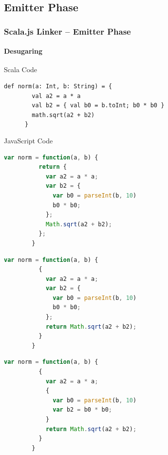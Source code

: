 \documentclass{beamer}
\begin{document}


\subsection{Emitter Phase}

\begin{frame}[fragile]
  \frametitle{Scala.js Linker -- Emitter Phase}
  \framesubtitle{Desugaring}

  \begin{block}{Scala Code\phantom{p}}
    \begin{lstlisting}[gobble=6]
      def norm(a: Int, b: String) = {
        val a2 = a * a
        val b2 = { val b0 = b.toInt; b0 * b0 }
        math.sqrt(a2 + b2)
      }
    \end{lstlisting}
  \end{block}

  \pause

  \begin{block}{JavaScript Code}
    \begin{overprint}
      \onslide<-+>
      \begin{lstlisting}[language=javascript,gobble=8]
        var norm = function(a, b) {
          return {
            var a2 = a * a;
            var b2 = {
              var b0 = parseInt(b, 10)
              b0 * b0;
            };
            Math.sqrt(a2 + b2);
          };
        }
      \end{lstlisting}

      \onslide<+>
      \begin{lstlisting}[language=javascript,gobble=8]
        var norm = function(a, b) {
          {
            var a2 = a * a;
            var b2 = {
              var b0 = parseInt(b, 10)
              b0 * b0;
            };
            return Math.sqrt(a2 + b2);
          }
        }
      \end{lstlisting}

      \onslide<+->
      \begin{lstlisting}[language=javascript,gobble=8]
        var norm = function(a, b) {
          {
            var a2 = a * a;
            {
              var b0 = parseInt(b, 10)
              var b2 = b0 * b0;
            }
            return Math.sqrt(a2 + b2);
          }
        }
      \end{lstlisting}
    \end{overprint}
  \end{block}

\end{frame}
\end{document}
